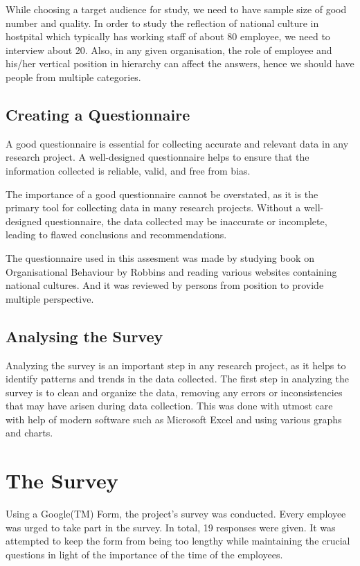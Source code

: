 \documentclass{article}
\begin{document}
While choosing a target audience for study, we need to have sample size of good number and quality. In order to study the reflection of national culture in hostpital which typically has working staff of about 80 employee, we need to interview about 20. Also, in any given organisation, the role of employee and his/her vertical position in hierarchy can affect the answers, hence we should have people from multiple categories.

\subsection{Creating a Questionnaire}

A good questionnaire is essential for collecting accurate and relevant data in any research project. A well-designed questionnaire helps to ensure that the information collected is reliable, valid, and free from bias.

The importance of a good questionnaire cannot be overstated, as it is the primary tool for collecting data in many research projects. Without a well-designed questionnaire, the data collected may be inaccurate or incomplete, leading to flawed conclusions and recommendations.

The questionnaire used in this assesment was made by studying book on Organisational Behaviour by Robbins and reading various websites containing national cultures. And it was reviewed by persons from position to provide multiple perspective.

\subsection{Analysing the Survey}

Analyzing the survey is an important step in any research project, as it helps to identify patterns and trends in the data collected. The first step in analyzing the survey is to clean and organize the data, removing any errors or inconsistencies that may have arisen during data collection. This was done with utmost care with help of modern software such as Microsoft Excel and using various graphs and charts.

\section{The Survey}

Using a Google(TM) Form, the project's survey was conducted. Every employee was urged to take part in the survey. In total, 19 responses were given. It was attempted to keep the form from being too lengthy while maintaining the crucial questions in light of the importance of the time of the employees.
\end{document}
